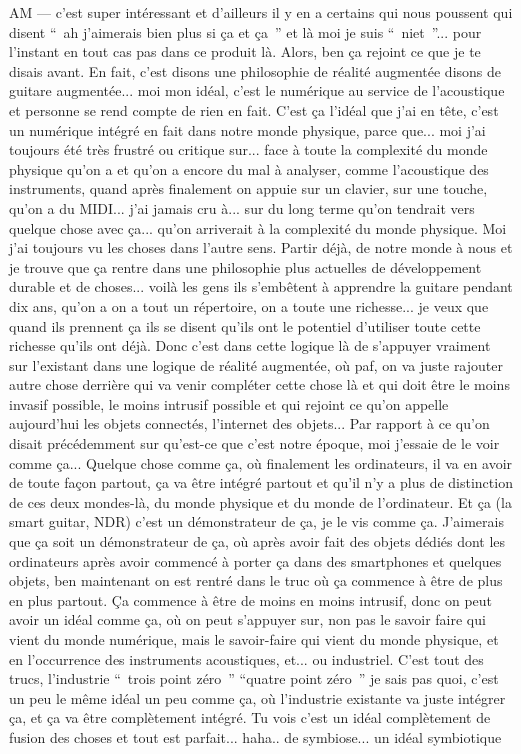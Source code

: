 AM — c'est super intéressant et d'ailleurs il y en a certains qui nous poussent qui disent “ ah j'aimerais bien plus si ça et ça ” et là moi je suis “ niet ”... pour l'instant en tout cas pas dans ce produit là. Alors, ben ça rejoint ce que je te disais avant. En fait, c'est disons une philosophie de réalité augmentée disons de guitare augmentée... moi mon idéal, c'est le numérique au service de l'acoustique et personne se rend compte de rien en fait. C'est ça l'idéal que j'ai en tête, c'est un numérique intégré en fait dans notre monde physique, parce que... moi j'ai toujours été très frustré ou critique sur... face à toute la complexité du monde physique qu'on a et qu'on a encore du mal à analyser, comme l'acoustique des instruments, quand après finalement on appuie sur un clavier, sur une touche, qu'on a du MIDI... j'ai jamais cru à... sur du long terme qu'on tendrait vers quelque chose avec ça... qu'on arriverait à la complexité du monde physique. Moi j'ai toujours vu les choses dans l'autre sens. Partir déjà, de notre monde à nous et je trouve que ça rentre dans une philosophie plus actuelles de développement durable et de choses... voilà les gens ils s'embêtent à apprendre la guitare pendant dix ans, qu'on a on a tout un répertoire, on a toute une richesse... je veux que quand ils prennent ça ils se disent qu'ils ont le potentiel d'utiliser toute cette richesse qu'ils ont déjà. Donc c'est dans cette logique là de s'appuyer vraiment sur l'existant dans une logique de réalité augmentée, où paf, on va juste rajouter autre chose derrière qui va venir compléter cette chose là et qui doit être le moins invasif possible, le moins intrusif possible et qui rejoint ce qu'on appelle aujourd'hui les objets connectés, l'internet des objets... Par rapport à ce qu'on disait précédemment sur qu'est-ce que c'est notre époque, moi j'essaie de le voir comme ça... Quelque chose comme ça, où finalement les ordinateurs, il va en avoir de toute façon partout, ça va être intégré partout et qu'il n'y a plus de distinction de ces deux mondes-là, du monde physique et du monde de l'ordinateur. Et ça (la smart guitar, NDR) c'est un démonstrateur de ça, je le vis comme ça. J'aimerais que ça soit un démonstrateur de ça, où après avoir fait des objets dédiés dont les ordinateurs après avoir commencé à porter ça dans des smartphones et quelques objets, ben maintenant on est rentré dans le truc où ça commence à être de plus en plus partout. Ça commence à être de moins en moins intrusif, donc on peut avoir un idéal comme ça, où on peut s'appuyer sur, non pas le savoir faire qui vient du monde numérique, mais le savoir-faire qui vient du monde physique, et en l'occurrence des instruments acoustiques, et... ou industriel. C'est tout des trucs, l'industrie “ trois point zéro ”  “quatre point zéro ” je sais pas quoi, c'est un peu le même idéal un peu comme ça, où l'industrie existante va juste intégrer ça, et ça va être complètement intégré. Tu vois c'est un idéal complètement de fusion des choses et tout est parfait... haha.. de symbiose... un idéal symbiotique

